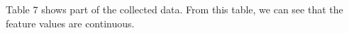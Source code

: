 \documentclass[
 size=14pt,
 paper=smartboard,  %
 mode=present, 		%
 display=slides, 	%
 style=tuliplab,  	%
 pauseslide,
 fleqn,leqno]{powerdot}
\begin{document}
\begin{note}
Table $7$ shows part of the collected data.
From this table,
we can see that the feature values are continuous.
\end{note}





\end{document}
